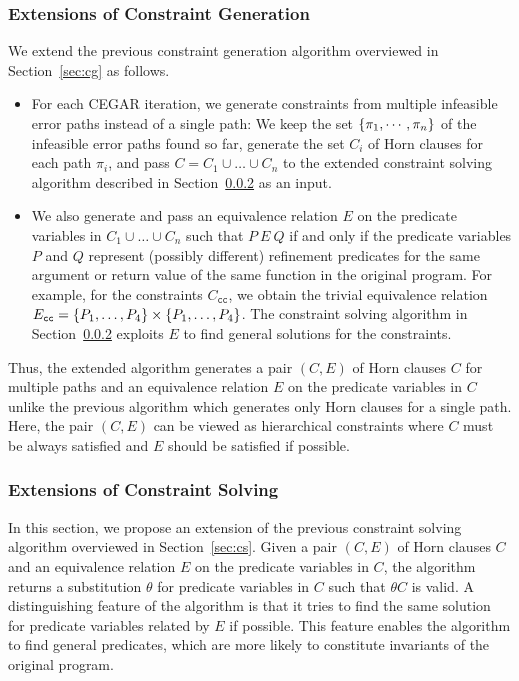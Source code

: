 \vspace{-2pt}
\subsubsection{Extensions of Constraint Generation}
\label{sec:extcg}

We extend the previous constraint generation algorithm overviewed in
Section~\ref{sec:cg} as follows.
\vspace{-4pt}
\begin{itemize}
\item For each CEGAR iteration, we generate constraints from multiple
infeasible error paths instead of a single path:  We keep the set
\(\{{\pi_1,\cdots,\pi_n}\}\) of the infeasible error paths found so far,
generate the set \(C_i\) of Horn clauses for each path \(\pi_i\), and
pass \(C=C_1 \cup \dots \cup C_n\) to the extended constraint solving
algorithm described in Section~\ref{sec:extcs} as an input.
\item We also generate and pass an equivalence relation \(E\) on the
predicate variables in \(C_1 \cup \dots \cup C_n\) such that \(P\ E\ Q\)
if and only if the predicate variables \(P\) and \(Q\) represent
(possibly different) refinement predicates for the same argument or
return value of the same function in the original program.  For example,
for the constraints \(C_{\texttt{cc}}\), we obtain the trivial
equivalence relation \(E_{\texttt{cc}}=\{{P_1,\dots,P_4}\} \times
\{{P_1,\dots,P_4}\}\).  The constraint solving algorithm in
Section~\ref{sec:extcs} exploits \(E\) to find general solutions for the
constraints.
\end{itemize}
\vspace{-4pt}
Thus, the extended algorithm generates a pair \((C,E)\) of Horn clauses
\(C\) for multiple paths and an equivalence relation \(E\) on the
predicate variables in \(C\) unlike the previous algorithm which
generates only Horn clauses for a single path.  Here, the pair \((C,E)\)
can be viewed as hierarchical constraints where \(C\) must be always
satisfied and \(E\) should be satisfied if possible.

\vspace{-2pt}
\subsubsection{Extensions of Constraint Solving}
\label{sec:extcs}

In this section, we propose an extension of the previous constraint
solving algorithm overviewed in Section~\ref{sec:cs}.  Given a pair
\((C,E)\) of Horn clauses \(C\) and an equivalence relation \(E\) on the
predicate variables in \(C\), the algorithm returns a substitution
\(\theta\) for predicate variables in \(C\) such that \(\theta C\) is
valid.  A distinguishing feature of the algorithm is that it tries to
find the same solution for predicate variables related by \(E\) if
possible.  This feature enables the algorithm to find general predicates,
which are more likely to constitute invariants of the original program.

